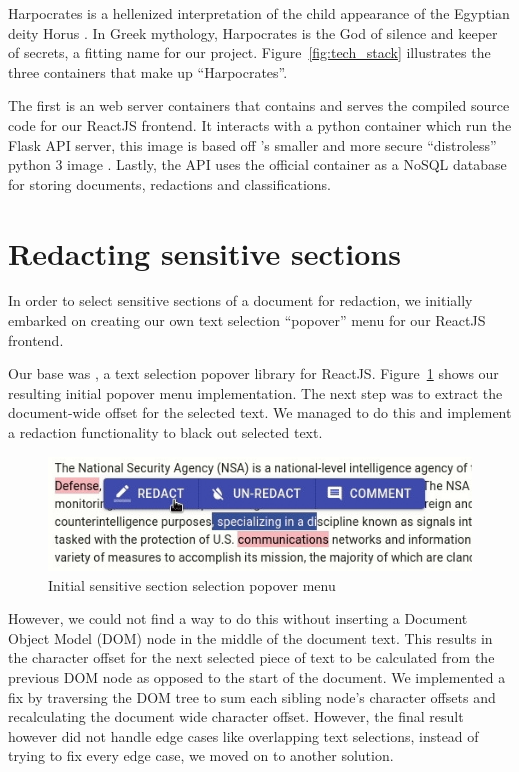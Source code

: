 \documentclass[\version]{l4proj}
\begin{document}
Harpocrates is a hellenized interpretation of the child appearance of the Egyptian deity Horus \autocite{mattheyChutSigneHarpocrate2011}.
In Greek mythology, Harpocrates is the God of silence and keeper of secrets, a fitting name for our project.
Figure~\ref{fig:tech_stack} illustrates the three containers that make up ``Harpocrates''.

The first is an \textcite{NGINX2020} web server containers that contains and serves the compiled source code for our ReactJS frontend.
It interacts with a python container which run the Flask API server, this image is based off \textcite{GoogleContainerToolsDistroless2020}'s smaller and more secure ``distroless'' python 3 image \autocite{mooreDistrolessDockerContainerizing2017}.
Lastly, the API uses the official \textcite{MongoDB2020} container as a NoSQL database for storing documents, redactions and classifications.

\section{Redacting sensitive sections}



In order to select sensitive sections of a document for redaction, we initially embarked on creating our own text selection ``popover'' menu for our ReactJS frontend.

Our base was \textcite{krispel-samselJuliankrispelReacttextselectionpopover2020}, a text selection popover library for ReactJS.
Figure~\ref{fig:popover_1} shows our resulting initial popover menu implementation.
The next step was to extract the document-wide offset for the selected text.
We managed to do this and implement a redaction functionality to black out selected text.
\begin{figure}
    \includegraphics[width=\linewidth]{images/popover_menu_1.jpg}
    \caption{Initial sensitive section selection popover menu}\label{fig:popover_1}
    \vspace{-10pt}
\end{figure}
However, we could not find a way to do this without inserting a Document Object Model (DOM) node in the middle of the document text.
This results in the character offset for the next selected piece of text to be calculated from the previous DOM node as opposed to the start of the document.
We implemented a fix by traversing the DOM tree to sum each sibling node's character offsets and recalculating the document wide character offset.
However, the final result however did not handle edge cases like overlapping text selections, instead of trying to fix every edge case, we moved on to another solution.
\end{document}

